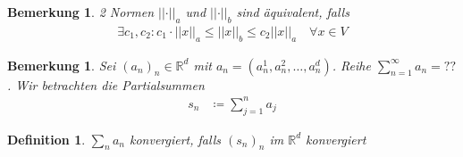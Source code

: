 \documentclass[11pt, twoside, a4paper]{article}
\theoremstyle{plain}
\newtheorem{bemerkung}[blockelement]{Bemerkung}
\newtheorem{definition}[blockelement]{Definition}
\newcommand{\pair}[1]{\left(#1\right)}
\newcommand{\abs}[1]{\left|#1\right|}
\newcommand{\norm}[1]{\abs{\abs{#1}}}
\newcommand{\definedas}[0]{\coloneqq}
\newcommand{\realnumbers}{\mathbb{R}}
\begin{document}
    \newpage



    \begin{bemerkung}
        \marginnote{[19. Dez]}
        2 Normen $\norm{\cdot}_a$ und $\norm{\cdot}_b$ sind äquivalent, falls
        \begin{align*}
            \exists c_1, c_2\colon c_1\cdot\norm{x}_a \leq \norm{x}_b \leq c_2 \norm{x}_a\quad\forall x\in V
        \end{align*}
    \end{bemerkung}

    \begin{bemerkung}
        Sei $(a_n)_n\in\realnumbers^d$ mit $a_n = \pair{a_n^1, a_n^2, \dots, a_n^d}$. Reihe $\sum_{n=1}^{\infty} a_n = ??$. Wir betrachten die Partialsummen
        \begin{align*}
            s_n &\definedas \sum_{j=1}^{n} a_j
        \end{align*}
    \end{bemerkung}

    \begin{definition}
        $\sum_{n} a_n$ konvergiert, falls $(s_n)_n$ im $\realnumbers^d$ konvergiert
    \end{definition}
\end{document}
